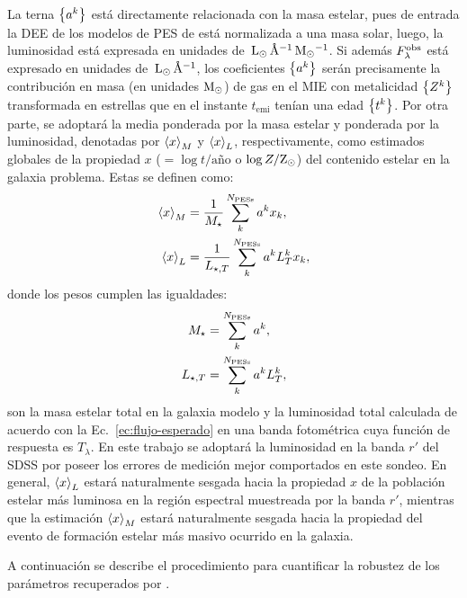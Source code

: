 La terna $\set{a^k}$ está directamente relacionada con la masa estelar, pues de entrada la DEE de
los modelos de PES de  está normalizada a una masa solar, luego, la luminosidad está
expresada en unidades de $\unit{\xsun{L}\,\AA\up{-1}\,\xsun{M}\up{-1}}$. Si además $\sedt[F]{obs}$
está expresado en unidades de $\unit{\xsun{L}\,\AA\up{-1}}$, los coeficientes $\set{a^k}$ serán
precisamente la contribución en masa (en unidades $\xsun{M}$) de gas en el MIE con metalicidad
$\set{Z^k}$ transformada en estrellas que en el instante $t_\text{emi}$ tenían una edad $\set{t^k}$.
Por otra parte, se adoptará la media ponderada por la masa estelar y ponderada por la luminosidad,
denotadas por $\mw{x}$ y $\lw{x}$, respectivamente, como estimados globales de la propiedad $x$
($=\log{t/\text{año}}$ o $\log{Z/\xsun{Z}}$) del contenido estelar en la galaxia problema. Estas se
definen como:
%
\begin{subequations}
\begin{align}
\mw{x} &= \frac{1}{M_\star}\sum_k^{\Nt{PESs}}a^k x_k, \\
\lw{x} &= \frac{1}{L_{\star,T}}\sum_k^{\Nt{PESs}}a^k L_T^k x_k,
\end{align}
\end{subequations}
%
donde los pesos cumplen las igualdades:
%
\begin{subequations}
\begin{align}
M_\star     &= \sum_k^{\Nt{PESs}}a^k, \\
L_{\star,T} &= \sum_k^{\Nt{PESs}}a^k L_T^k,
\end{align}
\end{subequations}
%
son la masa estelar total en la galaxia modelo y la luminosidad total calculada de acuerdo con la
Ec.~\eqref{ec:flujo-esperado} en una banda fotométrica cuya función de respuesta es $T_\lambda$. En
este trabajo se adoptará la luminosidad en la banda $r'$ del SDSS por poseer los errores de medición
mejor comportados en este sondeo. En general, $\lw{x}$ estará naturalmente sesgada hacia la
propiedad $x$ de la población estelar más luminosa en la región espectral muestreada por la banda
$r'$, mientras que la estimación $\mw{x}$ estará naturalmente sesgada hacia la propiedad del evento
de formación estelar más masivo ocurrido en la galaxia.

A continuación se describe el procedimiento para cuantificar la robustez de los parámetros
recuperados por \dynbas.


